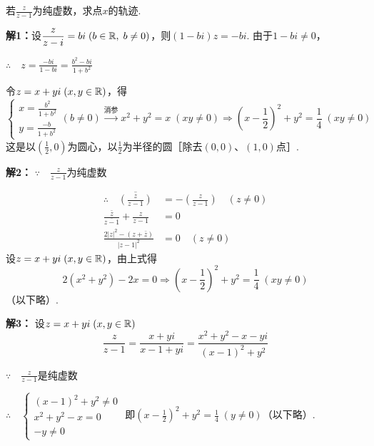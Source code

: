 \begin{example}
    若$\frac{z}{z-1}$为纯虚数，求点$x$的轨迹.
\end{example}

\begin{solution}
\textbf{解1：}设$\dfrac{z}{z-i}=bi\; (b\in\mathbb{R},\; b\ne 0)$，则$(1-bi)z=-bi$. 由于$1-bi\ne 0$，

$\therefore\quad z=\frac{-bi}{1-bi}=\frac{b^2-bi}{1+b^2}$

令$z=x+yi\; (x,y\in\mathbb{R})$，得
\[\begin{cases}
x=\frac{b^2}{1+b^2}
\\[1.5ex]
y=\frac{-b}{1+b^2}
\end{cases}(b\ne 0) \xrightarrow[]{\text{消参}}x^2+y^2=x\; (xy\ne 0)\Rightarrow \left(x-\frac{1}{2}\right)^2+y^2=\frac{1}{4}\; (xy\ne 0) \]
这是以$\left(\frac{1}{2},0\right)$为圆心，以$\frac{1}{2}$为半径的圆［除去$(0,0)$、$(1,0)$点］.

\textbf{解2：}
$\because\quad \frac{z}{z-1}$为纯虚数

\[\begin{split}
    \therefore\quad \overline{\left(\frac{z}{z-1}\right)}&=-\left(\frac{z}{z-1}\right)\quad (z\ne 0)\\
    \frac{\bar z}{\overline{z-1}}+\frac{z}{z-1}&=0\\
    \frac{2|z|^2-(z+\bar z)}{|z-1|^2}&=0  \quad (z\ne 0)
\end{split}\]
设$z=x+yi\; (x,y\in\mathbb{R})$，由上式得
\[2(x^2+y^2)-2x=0\Rightarrow \left(x-\frac{1}{2}\right)^2+y^2=\frac{1}{4}\; (xy\ne 0)\]
（以下略）.

\textbf{解3：}
设$z=x+yi\; (x,y\in\mathbb{R})$
\[\frac{z}{z-1}=\frac{x+yi}{x-1+yi}=\frac{x^2+y^2-x-yi}{(x-1)^2+y^2}\]

$\because\quad \frac{z}{z-1}$是纯虚数

$\therefore\quad \begin{cases}
    (x-1)^2+y^2\ne 0\\
    x^2+y^2-x=0\\
    -y\ne 0
\end{cases}$
即$\left(x-\frac{1}{2}\right)^2+y^2=\frac{1}{4}\; (y\ne 0)$（以下略）.
\end{solution}

